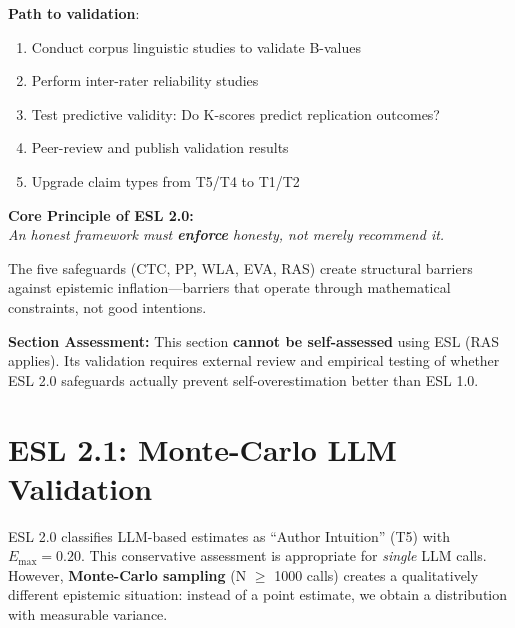 \documentclass[11pt,a4paper]{article}
\begin{document}
\textbf{Path to validation}:
\begin{enumerate}
    \item Conduct corpus linguistic studies to validate B-values
    \item Perform inter-rater reliability studies
    \item Test predictive validity: Do K-scores predict replication outcomes?
    \item Peer-review and publish validation results
    \item Upgrade claim types from T5/T4 to T1/T2
\end{enumerate}

\begin{insightbox}
\textbf{Core Principle of ESL 2.0:} \\[0.3em]
\textit{An honest framework must \textbf{enforce} honesty, not merely recommend it.}

The five safeguards (CTC, PP, WLA, EVA, RAS) create structural barriers against epistemic inflation---barriers that operate through mathematical constraints, not good intentions.
\end{insightbox}

\begin{eslbox}
\textbf{Section Assessment:} This section \textbf{cannot be self-assessed} using ESL (RAS applies). Its validation requires external review and empirical testing of whether ESL 2.0 safeguards actually prevent self-overestimation better than ESL 1.0.
\end{eslbox}

\section{ESL 2.1: Monte-Carlo LLM Validation}
\label{sec:esl21}


ESL 2.0 classifies LLM-based estimates as ``Author Intuition'' (T5) with $E_{\max} = 0.20$. This conservative assessment is appropriate for \textit{single} LLM calls. However, \textbf{Monte-Carlo sampling} (N $\geq$ 1000 calls) creates a qualitatively different epistemic situation: instead of a point estimate, we obtain a distribution with measurable variance.
\end{document}
